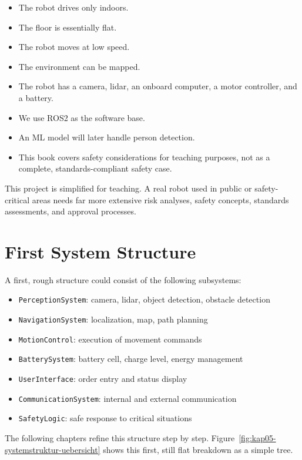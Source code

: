 \begin{itemize}
    \item The robot drives only indoors.
    \item The floor is essentially flat.
    \item The robot moves at low speed.
    \item The environment can be mapped.
    \item The robot has a camera, lidar, an onboard computer, a motor controller, and a battery.
    \item We use ROS2 as the software base.
    \item An ML model will later handle person detection.
    \item This book covers safety considerations for teaching purposes, not as a complete, standards-compliant safety case.
\end{itemize}

\begin{hinweisbox}
This project is simplified for teaching. A real robot used in public or safety-critical areas needs far more extensive risk analyses, safety concepts, standards assessments, and approval processes.
\end{hinweisbox}

\section{First System Structure}
A first, rough structure could consist of the following subsystems:

\begin{itemize}
    \item \texttt{PerceptionSystem}: camera, lidar, object detection, obstacle detection
    \item \texttt{NavigationSystem}: localization, map, path planning
    \item \texttt{MotionControl}: execution of movement commands
    \item \texttt{BatterySystem}: battery cell, charge level, energy management
    \item \texttt{UserInterface}: order entry and status display
    \item \texttt{CommunicationSystem}: internal and external communication
    \item \texttt{SafetyLogic}: safe response to critical situations
\end{itemize}

The following chapters refine this structure step by step. Figure~\ref{fig:kap05-systemstruktur-uebersicht} shows this first, still flat breakdown as a simple tree.

